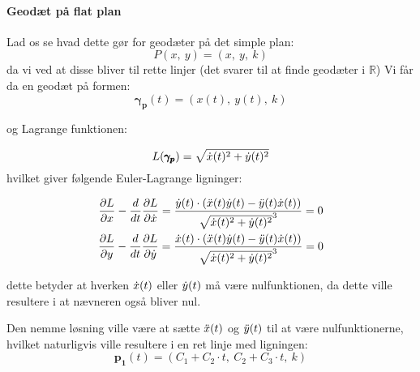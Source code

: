 \paragraph{Geodæt på flat plan}
Lad os se hvad dette gør for geodæter på det simple plan:
\begin{equation}\label{eq:P}
P(x,~y) = (x,~y,~k)
\end{equation}
da vi ved at disse bliver til rette linjer (det svarer til at finde geodæter i \(\mathbb{R}\))
%
Vi får da en geodæt på formen:
\begin{equation*}
\pmb{\gamma_p}(t) = (x(t),~y(t),~k)
\end{equation*}
%

og Lagrange funktionen:

\begin{equation*}
L(\pmb{\gamma_p}) = \sqrt{ \dot{x}(t)^2 + \dot{y}(t)^2 }
\end{equation*}
%
hvilket giver følgende Euler-Lagrange ligninger:

\begin{equation*}
\begin{gathered}
\frac{\partial L}{\partial x} - \frac{d}{d t} \frac{\partial L}{\partial \dot{x}} =
\frac{\dot{y}(t) \cdot ( \ddot{x}(t)\dot{y}(t) - \ddot{y}(t)\dot{x}(t) )}{\sqrt{\dot{x}(t)^2 + \dot{y}(t)^2}^3} = 0\\
\frac{\partial L}{\partial y} - \frac{d}{d t} \frac{\partial L}{\partial \dot{y}} =
\frac{\dot{x}(t) \cdot ( \ddot{x}(t)\dot{y}(t) - \ddot{y}(t)\dot{x}(t) )}{\sqrt{\dot{x}(t)^2 + \dot{y}(t)^2}^3} = 0\\
\end{gathered}
\end{equation*}

%
dette betyder at hverken  \( \dot{x}(t) \) eller \(\dot{y}(t) \) må være nulfunktionen,
da dette ville resultere i at nævneren også bliver nul.

Den nemme løsning ville være at sætte \(\ddot{x}(t)\) og \(\ddot{y}(t)\) til at være nulfunktionerne,
hvilket naturligvis ville resultere i en ret linje med ligningen:
\begin{equation*}
\pmb{p_1}(t) = (C_1 + C_2\cdot t,~C_2 + C_3\cdot t,~k)
\end{equation*}

